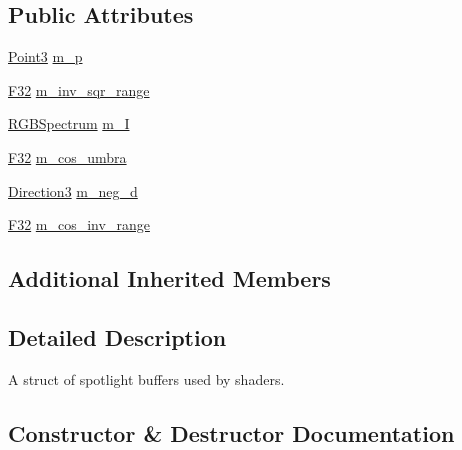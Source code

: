 \subsection*{Public Attributes}
\begin{DoxyCompactItemize}
\item 
\hyperlink{structmage_1_1_point3}{Point3} \hyperlink{structmage_1_1_spot_light_buffer_a6cb32b6089b90aa937df99bb794884e3}{m\+\_\+p}
\item 
\hyperlink{namespacemage_aa97e833b45f06d60a0a9c4fc22ae02c0}{F32} \hyperlink{structmage_1_1_spot_light_buffer_ab4039d0e1761aba882126c8fd34f309c}{m\+\_\+inv\+\_\+sqr\+\_\+range}
\item 
\hyperlink{structmage_1_1_r_g_b_spectrum}{R\+G\+B\+Spectrum} \hyperlink{structmage_1_1_spot_light_buffer_a778a729e75ff4074fc5aede42f551ab2}{m\+\_\+I}
\item 
\hyperlink{namespacemage_aa97e833b45f06d60a0a9c4fc22ae02c0}{F32} \hyperlink{structmage_1_1_spot_light_buffer_a7f12f0a2f82b99253e4ae9aff259b3ed}{m\+\_\+cos\+\_\+umbra}
\item 
\hyperlink{structmage_1_1_direction3}{Direction3} \hyperlink{structmage_1_1_spot_light_buffer_ae0baddd8256464e3cdf91a766f9bf143}{m\+\_\+neg\+\_\+d}
\item 
\hyperlink{namespacemage_aa97e833b45f06d60a0a9c4fc22ae02c0}{F32} \hyperlink{structmage_1_1_spot_light_buffer_a8d2f3b3ba07a93aaf20de1a59124b9a3}{m\+\_\+cos\+\_\+inv\+\_\+range}
\end{DoxyCompactItemize}
\subsection*{Additional Inherited Members}


\subsection{Detailed Description}
A struct of spotlight buffers used by shaders. 

\subsection{Constructor \& Destructor Documentation}
\hypertarget{structmage_1_1_spot_light_buffer_a862141be0a9dfe1fd3117141924650d5}{}\label{structmage_1_1_spot_light_buffer_a862141be0a9dfe1fd3117141924650d5} 
